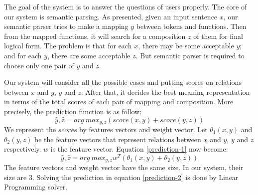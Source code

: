 \label{sec:system-overview}
The goal of the system is to answer the questions of users properly. The core of our system is semantic parsing. As presented, given an input sentence $x$, our semantic parser tries to make a mapping $y$ between tokens and functions. Then from the mapped functions, it will search for a composition $z$ of them for final logical form. The problem is that for each $x$, there may be some acceptable $y$; and for each $y$, there are some acceptable $z$. But semantic parser is required to choose only one pair of $y$ and $z$. 

Our system will consider all the possible cases and putting scores on relations between $x$ and $y$, $y$ and $z$. After that, it decides the best meaning representation in terms of the total scores of each pair of  mapping and composition. More precisely, the prediction function is as follow:
\begin{equation}
\label{prediction-1}
\hat{y}, \hat{z} = arg \ max_{y,z} (score(x, y) + score(y,z) )
\end{equation}
We represent the $score$s by features vectors and weight vector. Let $\theta_1(x, y)$ and $\theta_2(y,z)$ be the feature vectors that represent relations between $x$ and $y$, $y$ and $z$ respectively. $w$ is the feature vector. Equation \ref{prediction-1} now become:
\begin{equation}
\label{prediction-2}
\hat{y}, \hat{z} = arg \ max_{y,z} w^T(\theta_1(x, y) + \theta_2(y,z) )
\end{equation}
The feature vectors and weight vector have the same size. In our system, their size are $3$. Solving the prediction in equation \ref{prediction-2} is done by Linear Programming solver. 

%
%
